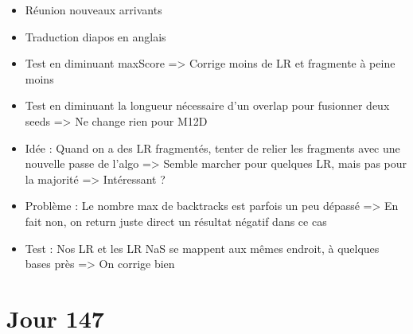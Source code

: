 \documentclass[12pt]{report}
\begin{document}
\begin{itemize}
	\item Réunion nouveaux arrivants
	
	\item Traduction diapos en anglais
	
	\item Test en diminuant maxScore => Corrige moins de LR et fragmente à peine moins
	
	\item Test en diminuant la longueur nécessaire d'un overlap pour fusionner deux seeds => Ne change rien pour M12D
	
	\item Idée : Quand on a des LR fragmentés, tenter de relier les fragments avec une nouvelle passe de l'algo => Semble marcher pour quelques LR,
		  mais pas pour la majorité => Intéressant ?
	
	\item Problème : Le nombre max de backtracks est parfois un peu dépassé => En fait non, on return juste direct un résultat négatif dans ce cas
	
	\item Test : Nos LR et les LR NaS se mappent aux mêmes endroit, à quelques bases près => On corrige bien
\end{itemize}

\section{Jour 147}
\end{document}
